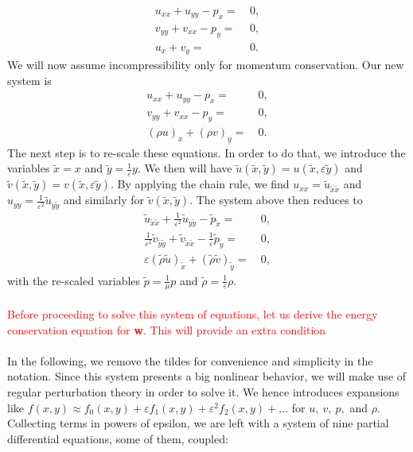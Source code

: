 \documentclass{article}
\begin{document}
\begin{align}
\label{eq:navmomx}
u_{xx} + u_{yy} - p_{x} =&\ 0,\\
\label{eq:navmomy}
v_{yy} + v_{xx} - p_{y} =&\ 0,\\
\label{eq:navmas}
u_{x} + v_{y} =&\ 0 .
\end{align}
We will now assume incompressibility only for momentum conservation. Our new system is
\begin{align}
\label{eq:navmomx2}
u_{xx} + u_{yy} - p_{x} =&\ 0,\\
\label{eq:navmomy2}
v_{yy} + v_{xx} - p_{y} =&\ 0,\\
\label{eq:navmas2}
(\rho u)_{x} + (\rho v)_{y} =&\ 0 .
\end{align}
The next step is to re-scale these equations. In order to do that, we introduce the variables $\tilde{x} = x$ and $\tilde{y} = \frac{1}{\varepsilon}y$. We then will have $\tilde{u}(\tilde{x},\tilde{y}) = u(\tilde{x},\varepsilon\tilde{y})$ and $\tilde{v}(\tilde{x},\tilde{y}) = v(\tilde{x},\varepsilon\tilde{y})$. By applying the chain rule, we find $u_{xx} = \tilde{u}_{\tilde{x}\tilde{x}}$ and $u_{yy} = \frac{1}{\varepsilon^{2}}\tilde{u}_{\tilde{y}\tilde{y}}$ and similarly for $\tilde{v}(\tilde{x},\tilde{y})$. The system above then reduces to 
\begin{align}
\label{eq:navmomx2sc}
\tilde{u}_{\tilde{x}\tilde{x}} + \frac{1}{\varepsilon^{2}}\tilde{u}_{\tilde{y}\tilde{y}} - \tilde{p}_{\tilde{x}} =&\ 0,\\
\label{eq:navmomy2sc}
\frac{1}{\varepsilon^{2}}\tilde{v}_{\tilde{y}\tilde{y}} + \tilde{v}_{\tilde{x}\tilde{x}} - \frac{1}{\varepsilon}\tilde{p}_{\tilde{y}} =&\ 0,\\
\label{eq:navmas2sc}
\varepsilon(\tilde{\rho} \tilde{u})_{\tilde{x}} + (\tilde{\rho} \tilde{v})_{\tilde{y}} =&\ 0,
\end{align}
with the re-scaled variables $\tilde{p} = \frac{1}{\mu} p$ and $\tilde{\rho}=\frac{1}{\varepsilon}\rho$.\\\\
\textcolor{red}{Before proceeding to solve this system of equations, let us derive the energy conservation equation for \textbf{w}. This will provide an extra condition}\\\\
In the following, we remove the tildes for convenience and simplicity in the notation. Since this system presents a big nonlinear behavior, we will make use of regular perturbation theory in order to solve it. We hence introduces expansions like $f(x,y) \approx f_{0}(x,y) + \varepsilon f_{1}(x,y) + \varepsilon^{2} f_{2}(x,y)+ \dots$ for $u,\ v,\ p,$ and $\rho$. Collecting terms in powers of epsilon, we are left with a system of nine partial differential equations, some of them, coupled:
\end{document}
